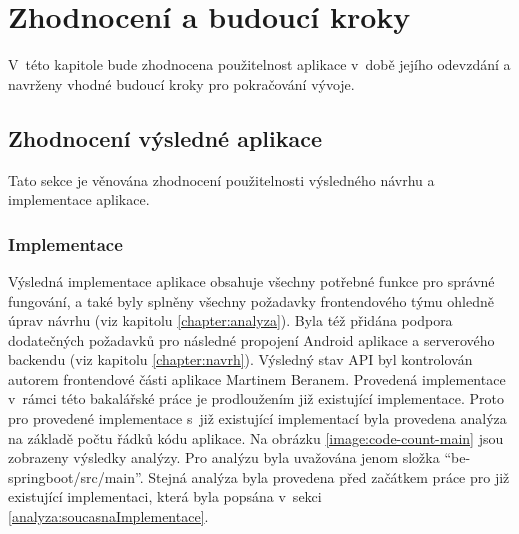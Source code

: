 \chapter{Zhodnocení a budoucí kroky}\label{zhodnocení}
V~této kapitole bude zhodnocena použitelnost aplikace v~době jejího odevzdání a navrženy vhodné budoucí kroky pro pokračování vývoje.
\section{Zhodnocení výsledné aplikace}
    Tato sekce je věnována zhodnocení použitelnosti výsledného návrhu a implementace aplikace. 
    \subsection{Implementace}
        Výsledná implementace aplikace obsahuje všechny potřebné funkce pro správné fungování, a také byly splněny všechny požadavky frontendového týmu ohledně úprav návrhu (viz kapitolu \ref{chapter:analyza}). Byla též přidána podpora dodatečných požadavků pro následné propojení Android aplikace a serverového backendu (viz kapitolu \ref{chapter:navrh}). Výsledný stav API byl kontrolován autorem frontendové části aplikace Martinem Beranem.
        Provedená implementace v~rámci této bakalářské práce je prodloužením již existující implementace. Proto pro provedené implementace s~již existující implementací byla provedena analýza na základě počtu řádků kódu aplikace. Na obrázku \ref{image:code-count-main} jsou zobrazeny výsledky analýzy.
        Pro analýzu byla uvažována jenom složka \enquote{be-springboot/src/main}. Stejná analýza byla provedena před začátkem práce pro již existující implementaci, která byla popsána v~sekci \ref{analyza:soucasnaImplementace}.
